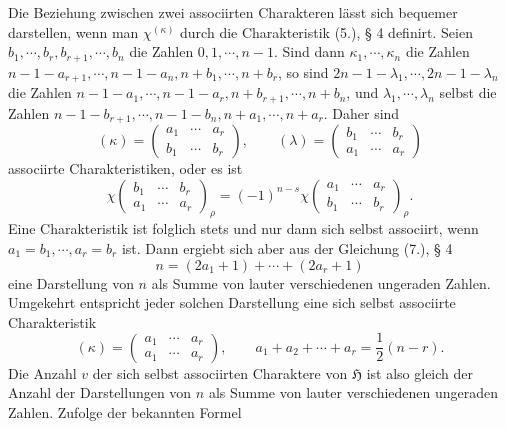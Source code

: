 \documentclass[11pt]{article}
\newcommand{\Hgr}{\mathfrak{H}}
\begin{document}
Die Beziehung zwischen zwei associirten Charakteren lässt sich bequemer darstellen, wenn man $\chi^{(\kappa)}$ durch die Charakteristik (5.), § 4 definirt. Seien $b_1,
\cdots,b_r,b_{r+1},
\cdots,b_n$ die Zahlen $0,1,
\cdots,n-1$. Sind dann $\kappa_1,
\cdots,
\kappa_n$ die Zahlen $n-1-a_{r+1},
\cdots,n-1-a_n,n+b_1,
\cdots,n+b_r$, so sind $2n-1-
\lambda_1,
\cdots,2n-1-
\lambda_n$ die Zahlen $n-1-a_1,
\cdots,n-1-a_r,n+b_{r+1},
\cdots,n+b_n$, und $\lambda_1,
\cdots,
\lambda_n$ selbst die Zahlen $n-1-b_{r+1},
\cdots,n-1-b_n,n+a_1,
\cdots,n+a_r$. Daher sind
\begin{equation}\tag{6.}
 (\kappa)=\left(\begin{matrix}a_1&\cdots&a_r\\ b_1&\cdots&b_r\end{matrix}\right),
 \qquad
 (\lambda)=\left(\begin{matrix}b_1&\cdots&b_r\\ a_1&\cdots&a_r\end{matrix}\right)
\end{equation}
associirte Charakteristiken, oder es ist
\begin{equation}\tag{7.}
 \chi\left(\begin{matrix}b_1&\cdots&b_r\\ a_1&\cdots&a_r\end{matrix}\right)_\rho
 =(-1)^{n-s}\chi\left(\begin{matrix}a_1&\cdots&a_r\\ b_1&\cdots&b_r\end{matrix}\right)_\rho.
\end{equation}
Eine Charakteristik ist folglich stets und nur dann sich selbst associirt, wenn $a_1=b_1,
\cdots,a_r=b_r$ ist. Dann ergiebt sich aber aus der Gleichung (7.), § 4
\begin{equation}\tag{8.}
 n=(2a_1+1)+
\cdots+(2a_r+1)
\end{equation}
eine Darstellung von $n$ als Summe von lauter verschiedenen ungeraden Zahlen. Umgekehrt entspricht jeder solchen Darstellung eine sich selbst associirte Charakteristik
\begin{equation}\tag{9.}
 (\kappa)=\left(\begin{matrix}a_1&\cdots&a_r\\ a_1&\cdots&a_r\end{matrix}\right),
 \qquad
 a_1+a_2+
\cdots+a_r=\frac12(n-r).
\end{equation}
Die Anzahl $v$ der sich selbst associirten Charaktere von $\Hgr$ ist also gleich der Anzahl der Darstellungen von $n$ als Summe von lauter verschiedenen ungeraden Zahlen. Zufolge der bekannten Formel
\end{document}
